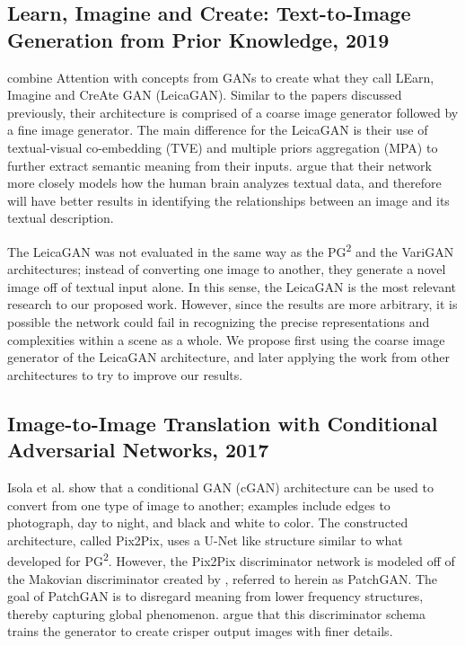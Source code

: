 \documentclass{article}
\begin{document}
\subsection*{Learn, Imagine and Create: Text-to-Image Generation from Prior Knowledge, 2019}
\nocite{leica}
\cite{leica} combine Attention with concepts from GANs to create what they call
LEarn, Imagine and CreAte GAN (LeicaGAN). Similar to the papers discussed
previously, their architecture is comprised of a coarse image generator followed
by a fine image generator. The main difference for the LeicaGAN is their use
of textual-visual co-embedding (TVE) and multiple priors aggregation (MPA)
to further extract semantic meaning from their inputs. \cite{leica} argue that
their network more closely models how the human brain analyzes textual data,
and therefore will have better results in identifying the relationships between
an image and its textual description.

The LeicaGAN was not evaluated in the same way as the PG\textsuperscript{2} and
the VariGAN architectures; instead of converting one image to another, they
generate a novel image off of textual input alone. In this sense, the LeicaGAN
is the most relevant research to our proposed work. However, since the results
are more arbitrary, it is possible the network could fail in recognizing the
precise representations and complexities within a scene as a whole.
We propose first using the coarse image generator of the LeicaGAN architecture,
and later applying the work from other architectures to try to improve
our results.

\subsection*{Image-to-Image Translation with Conditional Adversarial Networks, 2017}
\nocite{image_to_image}
Isola et al. show that a conditional GAN (cGAN) architecture can be used to
convert from one type of image to another; examples include edges to photograph,
day to night, and black and white to color. The constructed architecture, called
Pix2Pix, uses a U-Net like structure similar to what
\cite{pose_guided_image_generation} developed for
PG\textsuperscript{2}. However, the Pix2Pix discriminator network is modeled off
of the Makovian discriminator created by \cite{markovian},
referred to herein as PatchGAN.
The goal of PatchGAN is to disregard meaning from lower frequency structures,
thereby capturing global phenomenon. \cite{image_to_image}
argue that this discriminator
schema trains the generator to create crisper output images with finer details.
\end{document}
